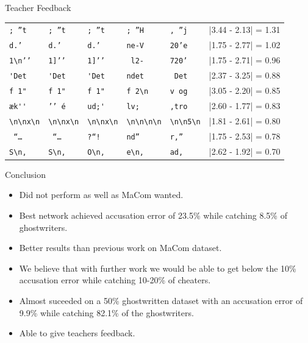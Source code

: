 \documentclass[10pt]{beamer}
\begin{document}
\begin{frame}[fragile]{Teacher Feedback}
\begin{center}
\begin{tabular}{lll|lll}
            \verb[; ”t[       & \verb[; ”t[       & \verb[; ”t[          &
            \verb'; ”H'       & \verb', ”j'       & |3.44 - 2.13| = 1.31 \\

            \verb[d.’ [       & \verb[d.’ [       & \verb[d.’ [          &
            \verb'ne-V'       & \verb'20’e'       & |1.75 - 2.77| = 1.02 \\

            \verb[1\n’’[      & \verb[1]’’[       & \verb[1]’’[          &
            \verb' l2-'       & \verb'720’'       & |1.75 - 2.71| = 0.96 \\

            \verb['Det[       & \verb['Det[       & \verb['Det[          &
            \verb'ndet'       & \verb' Det'       & |2.37 - 3.25| = 0.88 \\

            \verb[f 1"[       & \verb[f 1"[       & \verb[f 1"[          &
            \verb'f 2\n'      & \verb'v og'       & |3.05 - 2.20| = 0.85 \\

            \verb[æk''[       & \verb[’’ é[       & \verb[ud;'[          &
            \verb'lv; '       & \verb',tro'       & |2.60 - 1.77| = 0.83 \\

            \verb[\n\nx\n[    & \verb[\n\nx\n[    & \verb[\n\nx\n[       &
            \verb'\n\n\n\n'   & \verb'\n\n5\n'    & |1.81 - 2.61| = 0.80 \\
            \verb[ “… [       & \verb[ “… [       & \verb[?“! [          &
            \verb'nd” '       & \verb'r,” '       & |1.75 - 2.53| = 0.78 \\

            \verb[S\n, [      & \verb[S\n, [      & \verb[O\n, [         &
            \verb'e\n, '      & \verb'ad, '       & |2.62 - 1.92| = 0.70 \\
        \end{tabular}
    \end{center}
\end{frame}

\begin{frame}[fragile]{Conclusion}
    \begin{itemize}
        \item Did not perform as well as MaCom wanted.
        \item Best network achieved accusation error of 23.5\% while catching
            8.5\% of ghostwriters.
        \item Better results than previous work on MaCom dataset.
        \item We believe that with further work we would be able to get below
            the 10\% accusation error while catching 10-20\% of cheaters.
        \item Almost suceeded on a 50\% ghostwritten dataset with an accusation
            error of 9.9\% while catching 82.1\% of the ghostwriters.
        \item Able to give teachers feedback.
    \end{itemize}
\end{frame}
\end{document}

